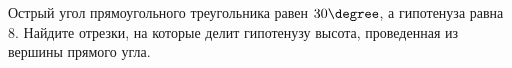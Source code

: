 \begin{ex}
	\begin{condition}
		Острый угол прямоугольного треугольника равен \( 30\degree \), а гипотенуза равна \( 8  \). Найдите отрезки, на которые делит гипотенузу высота, проведенная из вершины прямого угла.
	\end{condition}
\end{ex}